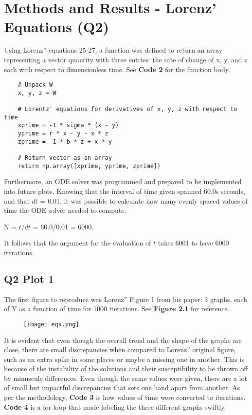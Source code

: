\documentclass[9pt,a4paper,twocolumn,twoside]{tau-class/tau}
\begin{document}
\section{Methods and Results - Lorenz' Equations (Q2)}
Using Lorenz'' equations 25-27, a function was defined to return an array representing a vector quantity with three entries: the rate of change of x, y, and z each with respect to dimensionless time. See \textbf{Code 2} for the function body.
\lstset{language=Python, caption= Lorenz'' Equations}
    \begin{lstlisting}
    # Unpack W
    x, y, z = W
    
    # Lorentz' equations for derivatives of x, y, z with respect to time 
    xprime = -1 * sigma * (x - y)
    yprime = r * x - y - x * z
    zprime = -1 * b * z + x * y

    # Return vector as an array 
    return np.array([xprime, yprime, zprime])
\end{lstlisting}

Furthermore, an ODE solver was programmed and prepared to be implemented into future plots. Knowing that the interval of time given spanned 60.0s seconds, and that \(dt\) = 0.01, it was possible to calculate how many evenly spaced values of time the ODE solver needed to compute. 
\medskip

N = \(t/dt\) = 60.0/0.01 = 6000. 
\medskip

It follows that the argument for the evaluation of \(t\) takes 6001 to have 6000 iterations. 

\subsection{Q2 Plot 1}
The first figure to reproduce was Lorenz'' Figure 1 from his paper: 3 graphs, each of Y as a function of time for 1000 iterations. See \textbf{Figure 2.1} for reference.  

\begin{figure}[h]
    \centering
    \texttt{[image: eqs.png]}
\end{figure}

It is evident that even though the overall trend and the shape of the graphs are close, there are small discrepancies when compared to Lorenz'' original figure, such as an extra spike in some places or maybe a missing one in another. This is because of the instability of the solutions and their susceptibility to be thrown off by minuscule differences. Even though the same values were given, there are a lot of small but impactful discrepancies that sets one hand apart from another. As per the methodology, \textbf{Code 3} is how values of time were converted to iterations. \textbf{Code 4} is a for loop that made labeling the three different graphs swiftly. 
\end{document}
